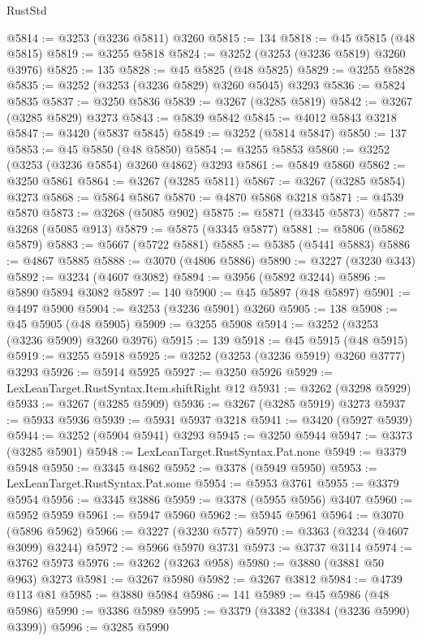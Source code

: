 \begin{lexlean}{RustStd}
\begin{coremodule}
@5814 := @3253 (@3236 @5811) @3260
@5815 := 134
@5818 := @45 @5815 (@48 @5815)
@5819 := @3255 @5818
@5824 := @3252 (@3253 (@3236 @5819) @3260 @3976)
@5825 := 135
@5828 := @45 @5825 (@48 @5825)
@5829 := @3255 @5828
@5835 := @3252 (@3253 (@3236 @5829) @3260 @5045) @3293
@5836 := @5824 @5835
@5837 := @3250 @5836
@5839 := @3267 (@3285 @5819)
@5842 := @3267 (@3285 @5829) @3273
@5843 := @5839 @5842
@5845 := @4012 @5843 @3218
@5847 := @3420 (@5837 @5845)
@5849 := @3252 (@5814 @5847)
@5850 := 137
@5853 := @45 @5850 (@48 @5850)
@5854 := @3255 @5853
@5860 := @3252 (@3253 (@3236 @5854) @3260 @4862) @3293
@5861 := @5849 @5860
@5862 := @3250 @5861
@5864 := @3267 (@3285 @5811)
@5867 := @3267 (@3285 @5854) @3273
@5868 := @5864 @5867
@5870 := @4870 @5868 @3218
@5871 := @4539 @5870
@5873 := @3268 (@5085 @902)
@5875 := @5871 (@3345 @5873)
@5877 := @3268 (@5085 @913)
@5879 := @5875 (@3345 @5877)
@5881 := @5806 (@5862 @5879)
@5883 := @5667 (@5722 @5881)
@5885 := @5385 (@5441 @5883)
@5886 := @4867 @5885
@5888 := @3070 (@4806 @5886)
@5890 := @3227 (@3230 @343)
@5892 := @3234 (@4607 @3082)
@5894 := @3956 (@5892 @3244)
@5896 := @5890 @5894 @3082
@5897 := 140
@5900 := @45 @5897 (@48 @5897)
@5901 := @4497 @5900
@5904 := @3253 (@3236 @5901) @3260
@5905 := 138
@5908 := @45 @5905 (@48 @5905)
@5909 := @3255 @5908
@5914 := @3252 (@3253 (@3236 @5909) @3260 @3976)
@5915 := 139
@5918 := @45 @5915 (@48 @5915)
@5919 := @3255 @5918
@5925 := @3252 (@3253 (@3236 @5919) @3260 @3777) @3293
@5926 := @5914 @5925
@5927 := @3250 @5926
@5929 := LexLeanTarget.RustSyntax.Item.shiftRight @12
@5931 := @3262 (@3298 @5929)
@5933 := @3267 (@3285 @5909)
@5936 := @3267 (@3285 @5919) @3273
@5937 := @5933 @5936
@5939 := @5931 @5937 @3218
@5941 := @3420 (@5927 @5939)
@5944 := @3252 (@5904 @5941) @3293
@5945 := @3250 @5944
@5947 := @3373 (@3285 @5901)
@5948 := LexLeanTarget.RustSyntax.Pat.none
@5949 := @3379 @5948
@5950 := @3345 @4862
@5952 := @3378 (@5949 @5950)
@5953 := LexLeanTarget.RustSyntax.Pat.some
@5954 := @5953 @3761
@5955 := @3379 @5954
@5956 := @3345 @3886
@5959 := @3378 (@5955 @5956) @3407
@5960 := @5952 @5959
@5961 := @5947 @5960
@5962 := @5945 @5961
@5964 := @3070 (@5896 @5962)
@5966 := @3227 (@3230 @577)
@5970 := @3363 (@3234 (@4607 @3099) @3244)
@5972 := @5966 @5970 @3731
@5973 := @3737 @3114
@5974 := @3762 @5973
@5976 := @3262 (@3263 @958)
@5980 := @3880 (@3881 @50 @963) @3273
@5981 := @3267 @5980
@5982 := @3267 @3812
@5984 := @4739 @113 @81
@5985 := @3880 @5984
@5986 := 141
@5989 := @45 @5986 (@48 @5986)
@5990 := @3386 @5989
@5995 := @3379 (@3382 (@3384 (@3236 @5990) @3399))
@5996 := @3285 @5990

\end{coremodule}
\end{lexlean}
